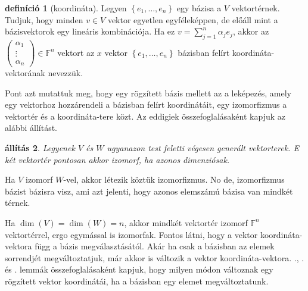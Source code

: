 \documentclass[a4paper, showtrims]{memoir}
\makeatletter
\renewenvironment{proof}[1][\proofname]
    {\par\pushQED{\qed}%
    \normalfont \topsep6\p@\@plus6\p@\relax
    \trivlist
    \item[\hskip\labelsep
        \itshape
    #1\@addpunct{:}]\ignorespaces}
    {\popQED\endtrivlist\@endpefalse}
\theoremstyle{plain}
\newtheorem{proposition}{állítás}[chapter]
\theoremstyle{remark}
\theoremstyle{definition}
\newtheorem{definition}[proposition]{definíció}
\makeatother
\begin{document}
\begin{definition}[koordináta]
	Legyen $\left\{ e_1,\ldots,e_n \right\}$ egy bázisa a $V$ vektortérnek.
	Tudjuk, hogy minden $v\in V$ vektor egyetlen egyféleképpen, de előáll mint a bázisvektorok egy lineáris kombinációja.
	Ha ez $v=\sum_{j=1}^n\alpha_je_j$, akkor az
	\begin{math}
		\begin{pmatrix}
			\alpha_1 \\ \vdots\\ \alpha_n
		\end{pmatrix}
		\in
		\mathbb{F}^n
	\end{math}
	vektort az $x$ vektor $\left\{ e_1,\ldots,e_n \right\}$ bázisban felírt koordináta-vektorának nevezzük.
\end{definition}
Pont azt mutattuk meg, hogy egy rögzített bázis mellett az a leképezés,
amely egy vektorhoz hozzárendeli a bázisban felírt koordinátáit, egy izomorfizmus
a vektortér és a koordináta-tere közt.
Az eddigiek összefoglalásaként kapjuk az alábbi állítást.
\begin{proposition}
	Legyenek $V$ és $W$ ugyanazon test feletti végesen generált vektorterek.
	E két vektortér pontosan akkor izomorf, ha azonos dimenziósak.
\end{proposition}
\begin{proof}
	Ha $V$ izomorf $W$-vel, akkor létezik köztük izomorfizmus.
	No de, izomorfizmus bázist bázisra visz, ami azt jelenti, hogy azonos elemszámú
	bázisa van mindkét térnek.

	Ha $\dim(V)=\dim(W)=n$, akkor mindkét vektortér izomorf $\mathbb{F}^n$ vektortérrel,
	ergo egymással is izomorfak.
\end{proof}
Fontos látni, hogy a vektor koordináta-vektora függ a bázis megválasztásától.
Akár ha csak a bázisban az elemek sorrendjét megváltoztatjuk,
már akkor is változik a vektor koordináta-vektora.
., .  és . lemmák összefoglalásaként kapjuk,
hogy milyen módon változnak egy rögzített vektor koordinátái,
ha a bázisban egy elemet megváltoztatunk.
\end{document}
